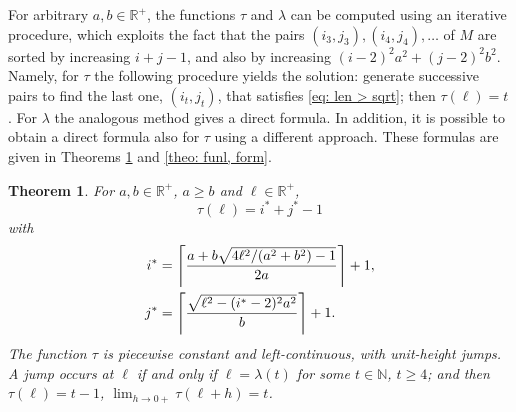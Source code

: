 \documentclass[12pt, a4paper]{article}
\let\Re\relax %
\DeclareMathOperator{\Re}{Re} %
\newcommand{\funt}{\tau} %
\newcommand{\funl}{\lambda} %
\newcommand{\len}{\ell} %
\newcommand{\tiles}{t} %
\newcommand{\isoli}{i^\ast}
\newcommand{\jsoli}{j^\ast}
\newcommand{\mss}{M}
\newtheorem{theorem}{Theorem}%
\begin{document}
For arbitrary $a, b \in \mathbb R^+$, the functions $\funt$ and $\funl$ can be computed using an iterative procedure, which exploits the fact that the pairs $(i_3,j_3), (i_4,j_4), \ldots$ of $\mss$ are sorted by increasing $i+j-1$, and also by increasing $(i-2)^2 a^2 + (j-2)^2 b^2$. Namely, for $\funt$ the following procedure yields the solution: generate successive pairs to find the last one, $(i_\tiles,j_\tiles)$, that satisfies \eqref{eq: len > sqrt}; then $\funt(\len) = \tiles$. For $\funl$ the analogous method gives a direct formula. In addition, it is possible to obtain a direct formula also for $\funt$ using a different approach. These formulas are given in Theorems \ref{theo: funt, form} and \ref{theo: funl, form}.

\begin{theorem}
\label{theo: funt, form}
For $a, b \in \mathbb R^+$, $a \geq b$ and $\len \in \mathbb R^+$,
\begin{equation}
\label{eq: theo: funt, form; funt}
\funt(\len) = \isoli+\jsoli-1
\end{equation}
with
\begin{align}
\label{eq: theo: funt, form; i}
\isoli &= \left\lceil \frac{a + b \Re \sqrt{4\len^2/(a^2+b^2)-1}}{2a} \right\rceil + 1, \\
\label{eq: theo: funt, form; j}
\jsoli &= \left\lceil \frac{\sqrt{\len^2-(\isoli-2)^2a^2}}{b} \right\rceil + 1.
\end{align}
The function $\funt$ is piecewise constant and left-continuous, with unit-height jumps. A jump occurs at $\len$ if and only if $\len = \funl(\tiles)$ for some $\tiles \in \mathbb N$, $\tiles \geq 4$; and then $\funt(\len) = \tiles-1$, $\lim_{h \rightarrow 0+} \funt(\len+h) = \tiles$.
\end{theorem}
\end{document}
